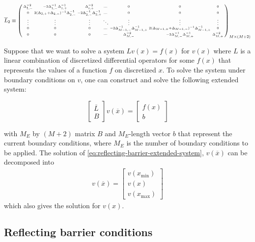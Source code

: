 \documentclass[11pt]{article}
\newenvironment{psmallmatrix}
{\left(\begin{smallmatrix}}
	{\end{smallmatrix}\right)}
\theoremstyle{definition}
\begin{document}
\begin{equation}\label{eq:L-2-extended} \small
\overline{L}_2 \equiv \begin{psmallmatrix}
\Delta_{1,-}^{-2} &-2\Delta_{1,-}^{-1} \Delta_{1,+}^{-1}  & \Delta_{i,+}^{-2}&\dots&0&0&0\\
0&2(\Delta_{2,+}+\Delta_{2,-})^{-1} \Delta_{2,-}^{-1} &-2\Delta_{2,-}^{-1} \Delta_{2,+}^{-1} &\dots&0&0&0\\
\vdots&\vdots&\vdots&\ddots&\vdots&\vdots&\vdots\\
0&0&0&\dots&-2\Delta_{M-1,-}^{-1} \Delta_{M-1,+}^{-1}  & 2 (\Delta_{M-1,+}+\Delta_{M-1,-})^{-1} \Delta_{M-1,+}^{-1}&0\\
0&0&0&\cdots&\Delta_{M,-}^{-2} &-2\Delta_{M,-}^{-1} \Delta_{M,+}^{-1}  & \Delta_{M,+}^{-2}
\end{psmallmatrix}_{M\times (M+2)}
\end{equation}


Suppose that we want to solve a system $L v({x}) = f(x) $ for $v(x)$ where $L$ is a linear combination of discretized differential operators for some $f(x)$ that represents the values of a function $f$ on discretized $x$. To solve the system under boundary conditions on $v$, one can construct and solve the following extended system:

\begin{equation}\label{eq:reflecting-barrier-extended-system}
\begin{bmatrix}
\overline{L} \\
B
\end{bmatrix} 
v(\overline{x}) = 
\begin{bmatrix}
f(x) \\
b
\end{bmatrix} 
\end{equation}

with $M_E$ by $(M+2)$ matrix $B$ and $M_E$-length vector $b$ that represent the current boundary conditions, where $M_E$ is the number of boundary conditions to be applied. The solution of \eqref{eq:reflecting-barrier-extended-system}, $v(\overline{x})$ can be decomposed into 
\begin{align}
v(\overline{x}) = \begin{bmatrix}
v(x_{\min}) \\
v(x) \\
v(x_{\max})
\end{bmatrix}
\end{align}
which also gives the solution for $v(x)$.

\subsection{Reflecting barrier conditions}
\end{document}
